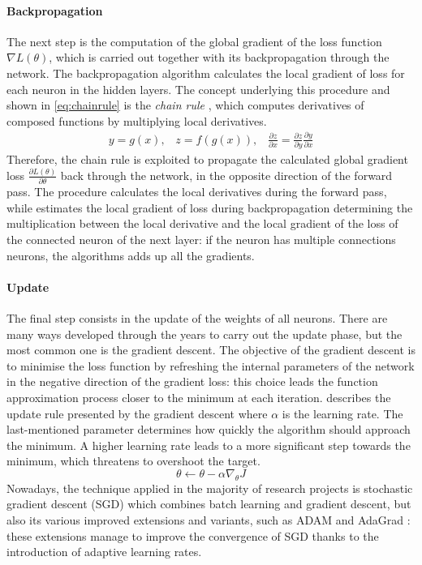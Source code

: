 \paragraph{Backpropagation}
The next step is the computation of the global gradient of the loss function $\nabla L(\theta)$, which is carried out together with its backpropagation through the network. The backpropagation algorithm \cite{rumelhart1988learning} calculates the local gradient of loss for each neuron in the hidden layers. The concept underlying this procedure and shown in \vref{eq:chainrule} is the \textit{chain rule} \cite{lecun2015deep}, which computes derivatives of composed functions by multiplying local derivatives.
\begin{equation}\label{eq:chainrule}
	\begin{gathered}
		y = g(x), \;\;\; z = f(g(x)),  \;\;\;
		\frac{\partial z}{\partial x} = \frac{\partial z}{\partial y} \frac{\partial y}{\partial x}
	\end{gathered}
\end{equation}
Therefore, the chain rule is exploited to propagate the calculated global gradient loss $\frac{\partial L(\theta)}{\partial \theta}$ back through the network, in the opposite direction of the forward pass.
The procedure calculates the local derivatives during the forward pass, while estimates the local gradient of loss during backpropagation determining the multiplication between the local derivative and the local gradient of the loss of the connected neuron of the next layer: if the neuron has multiple connections neurons, the algorithms adds up all the gradients.

\paragraph{Update} The final step consists in the update of the weights of all neurons. There are many ways developed through the years to carry out the update phase, but the most common one is the gradient descent.
The objective of the gradient descent is to minimise the loss function by refreshing the internal parameters of the network in the negative direction of the gradient loss: this choice leads the function approximation process closer to the minimum at each iteration.  describes the update rule presented by the gradient descent where $\alpha$ is the learning rate. The last-mentioned parameter determines how quickly the algorithm should approach the minimum. A higher learning rate leads to a more significant step towards the minimum, which threatens to overshoot the target.
\begin{equation}\label{eq:update}
	\theta \leftarrow \theta -\alpha \nabla_\theta J
\end{equation}
Nowadays, the technique applied in the majority of research projects is stochastic gradient descent (SGD) which combines batch learning \cite{stanford2019cs231n} and gradient descent, but also its various improved extensions and variants, such as ADAM \cite{kingma2014adam} and AdaGrad \cite{duchi2011adaptive}: these extensions manage to improve the convergence of SGD thanks to the introduction of adaptive learning rates.

